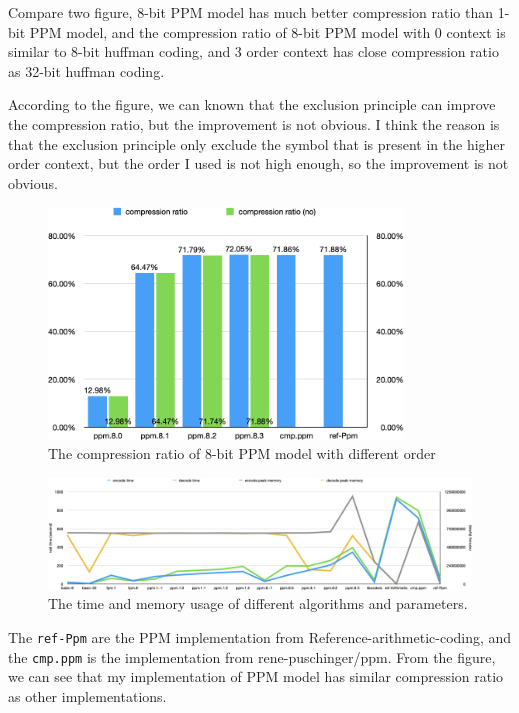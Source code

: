 \documentclass[a4paper,conference]{IEEEtran}
\begin{document}
Compare two figure, 8-bit PPM model has much better compression ratio than 1-bit PPM model, and the compression ratio of 8-bit PPM model with 0 context is similar to 8-bit huffman coding, and 3 order context has close compression ratio as 32-bit huffman coding.

According to the figure, we can known that the exclusion principle can improve the compression ratio, but the improvement is not obvious. I think the reason is that the exclusion principle only exclude the symbol that is present in the higher order context, but the order I used is not high enough, so the improvement is not obvious.

\begin{figure}[htbp]
\centerline{\includegraphics[height=6.15cm, keepaspectratio,]{assets/chart-ppm-8-cmp-2.png}}
\caption{The compression ratio of 8-bit PPM model with different order}
\label{fig-chart-ppm-8}
\end{figure}


\begin{figure}[htbp]
\centerline{\includegraphics[width=20cm, keepaspectratio,]{assets/chart-perf.png}}
\caption{The time and memory usage of different algorithms and parameters.}
\label{fig-chart-perf}
\end{figure}

The \texttt{ref-Ppm} are the PPM implementation from Reference-arithmetic-coding\cite{Reference-arithmetic-coding}, and the \texttt{cmp.ppm} is the implementation from rene-puschinger/ppm\cite{rene-puschinger/ppm}.
From the figure, we can see that my implementation of PPM model has similar compression ratio as other implementations.
\end{document}
